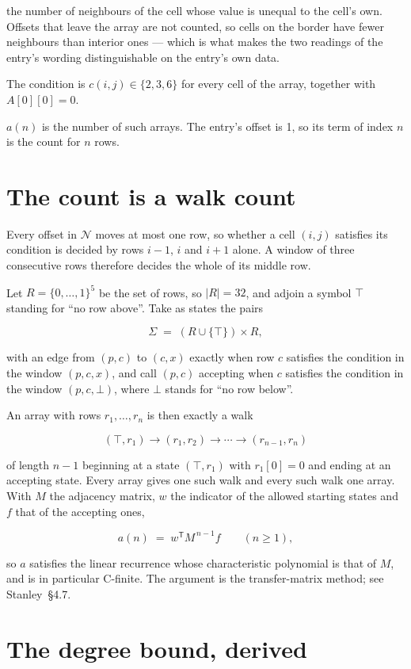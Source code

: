 \documentclass[11pt]{article}
\theoremstyle{definition}
\begin{document}
the number of neighbours of the cell whose value is unequal to the cell's own. Offsets that leave the array are not counted, so cells on the border have fewer neighbours than interior ones --- which is what makes the two readings of the entry's wording distinguishable on the entry's own data.

The condition is $c(i,j) \in \{2, 3, 6\}$ for every cell of the array, together with $A[0][0]=0$.

$a(n)$ is the number of such arrays. The entry's offset is 1, so its term of index $n$ is the count for $n$ rows.

\section{The count is a walk count}

Every offset in $\mathcal{N}$ moves at most one row, so whether a cell $(i,j)$ satisfies its condition is decided by rows $i-1$, $i$ and $i+1$ alone. A window of three consecutive rows therefore decides the whole of its middle row.

Let $R = \{0,\dots,1\}^{5}$ be the set of rows, so $|R| = 32$, and adjoin a symbol $\top$ standing for ``no row above''. Take as states the pairs

\[\Sigma \;=\; (R \cup \{\top\}) \times R,\]

with an edge from $(p,c)$ to $(c,x)$ exactly when row $c$ satisfies the condition in the window $(p,c,x)$, and call $(p,c)$ accepting when $c$ satisfies the condition in the window $(p,c,\bot)$, where $\bot$ stands for ``no row below''.

An array with rows $r_1,\dots,r_n$ is then exactly a walk

\[(\top,r_1) \to (r_1,r_2) \to \cdots \to (r_{n-1},r_n)\]

of length $n-1$ beginning at a state $(\top,r_1)$ with $r_1[0]=0$ and ending at an accepting state. Every array gives one such walk and every such walk one array. With $M$ the adjacency matrix, $w$ the indicator of the allowed starting states and $f$ that of the accepting ones,

\[a(n) \;=\; w^{\mathsf T} M^{\,n-1} f \qquad (n \ge 1),\]

so $a$ satisfies the linear recurrence whose characteristic polynomial is that of $M$, and is in particular C-finite. The argument is the transfer-matrix method; see Stanley~\S4.7.

\section{The degree bound, derived}
\end{document}
